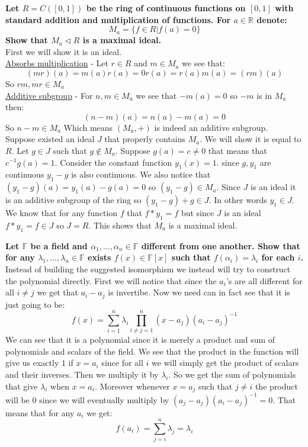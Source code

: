 \documentclass{article}
\theoremstyle{plain}
\DeclareMathOperator{\idealin}{\triangleleft}
\newcommand{\R}{\mathbb{R}}
\newcommand{\F}{\mathbb{F}}
\begin{document}
	\newpage
	
	\textbf{Let $R=C([0,1])$ be the ring of continuous functions on $[0,1]$ 
    with standard addition and multiplication of functions. 
    For $a\in\R$ denote:
	\[
		M_a = \{f\in R \vert f(a) = 0\}
	\]
	Show that $M_a \idealin R$ is a maximal ideal.} \\
    First we will show it is an ideal. \\
    \underline{Absorbs multiplication} - Let $r\in R$ and $m\in M_a$
    we see that:
    \[
        (mr)(a) = m(a)r(a) = 0r(a) = r(a)m(a) = (rm)(a)
    \]
    So $rm,mr\in M_a$ \\
    \underline{Additive subgroup} - For $n,m\in M_a$
    we see that $-m(a)=0$ so $-m$ is in $M_a$ then:
    \[
        (n-m)(a) = n(a) - m(a) = 0
    \]
    So $n-m\in M_a$ Which means $(M_a,+)$ is indeed an additive
    subgroup. \\
    Suppose existed an ideal $J$ that properly contains $M_a$.
    We will show it is equal to $R$. Let $g\in J$ such that
    $g\notin M_a$. Suppose $g(a)=c\neq 0$ that means that
    $c^{-1}g(a) = 1$. Consider the constant function $y_1(x)=1$.
    since $g,y_1$ are continuous $y_1-g$ is also continuous.
    We also notice that $(y_1-g)(a) = y_1(a) - g(a) = 0$ so 
    $(y_1-g)\in M_a$. Since $J$ is an ideal it is an additive 
    subgroup of the ring so $(y_1-g)+g\in J$. In other words
    $y_1\in J$. We know that for any function $f$ that $f*y_1=f$
    but since $J$ is an ideal $f*y_1=f\in J$ so $J=R$. This shows
    that $M_a$ is a maximal ideal.

	\newpage
	
	\textbf{Let $\F$ be a field and $\alpha_1,\dots,\alpha_n\in\F$ different 
	from one another. Show that for any $\lambda_1,\dots,\lambda_n\in\F$ 
	exists $f(x)\in\F[x]$ such that $f(\alpha_i) = \lambda_i$ for each $i$.}\\
    Instead of building the suggested isomorphism we instead will
    try to construct the polynomial directly. First we will notice
    that since the $a_i$'s are all different for all $i\neq j$
    we get that $a_i-a_j$ is invertibe. Now we need can in fact
    see that it is just going to be:
    \[
    f(x) = \sum_{i=1}^{n}\lambda_i 
    \prod_{i\neq j=1}^{n}{(x-a_j)(a_i-a_j)^{-1}}
    \]
    We can see that it is a polynomial since it is merely a product
    and sum of polynomials and scalars of the field. We see
    that the product in the function will give us exactly $1$
    if $x=a_i$ since for all $i$ we will simply get
    the product of scalars and their inverses. Then we multiply it by $
    \lambda_i$. So we get the sum of polynomials that give $\lambda_i$ when 
    $x=a_i$. Moreover whenever $x=a_j$ such that
    $j\neq i$ the product will be $0$ since we will eventually
    multiply by $(a_j-a_j)(a_i-a_j)^{-1}=0$. That means that
    for any $a_i$ we get:
    \[
    f(a_i) = \sum_{j=i}^{n}{\lambda_j} = \lambda_i
    \]
	\newpage
	
\end{document}
